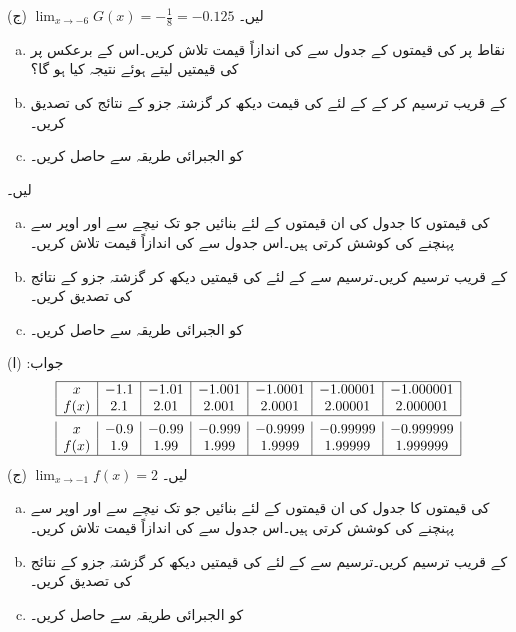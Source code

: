 (ج)
$\lim_{x\to -6} G(x)=-\tfrac{1}{8}=-0.125$ 
 لیں۔
\begin{enumerate}[a.]
\item
نقاط  پر  کی قیمتوں کے جدول سے  کی اندازاً قیمت تلاش کریں۔اس کے برعکس  پر  کی قیمتیں لیتے ہوئے نتیجہ کیا ہو گا؟
\item
{} کے قریب  ترسیم کر کے  کے لئے  کی قیمت دیکھ کر گزشتہ جزو کے نتائج کی تصدیق کریں۔
\item
{} کو الجبرائی طریقہ سے حاصل کریں۔
\end{enumerate}
 لیں۔
\begin{enumerate}[a.]
\item
{} کی قیمتوں کا جدول  کی ان قیمتوں کے لئے بنائیں جو  تک نیچے سے اور اوپر سے پہنچنے کی کوشش کرتی ہیں۔اس جدول سے  کی اندازاً قیمت تلاش کریں۔  
\item
{} کے قریب  ترسیم کریں۔ترسیم سے  کے لئے  کی قیمتیں دیکھ کر گزشتہ جزو کے نتائج کی تصدیق کریں۔
\item
{} کو الجبرائی طریقہ سے حاصل کریں۔
\end{enumerate}
جواب: (ا)
\begin{align*}
\begin{array}{|c|c|c|c|c|c|c|}
\hline
x&-1.1&-1.01&-1.001&-1.0001&-1.00001&-1.000001\\
f(x)&2.1&2.01&2.001&2.0001&2.00001&2.000001\\
\hline
\end{array}\\
\begin{array}{|c|c|c|c|c|c|c|}
x&-0.9&-0.99&-0.999&-0.9999&-0.99999&-0.999999\\
f(x)&1.9&1.99&1.999&1.9999&1.99999&1.999999\\
\hline
\end{array}
\end{align*}
(ج)
$\lim_{x\to -1} f(x)=2$
 لیں۔
\begin{enumerate}[a.]
\item
{} کی قیمتوں کا جدول  کی ان قیمتوں کے لئے بنائیں جو  تک نیچے سے اور اوپر سے پہنچنے کی کوشش کرتی ہیں۔اس جدول سے
  کی اندازاً قیمت تلاش کریں۔  
\item
{} کے قریب  ترسیم کریں۔ترسیم سے  کے لئے  کی قیمتیں دیکھ کر گزشتہ جزو کے نتائج کی تصدیق کریں۔
\item
{} کو الجبرائی طریقہ سے حاصل کریں۔
\end{enumerate}
